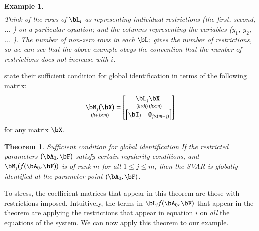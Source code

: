 \documentclass [12pt]{article}
\newtheorem{example}{Example}
\newtheorem{theorem}{Theorem}
\begin{document}
\begin{example}{}
\begin{align*}
        \end{align*}
        Think of the rows of $\bL_i$ as representing individual restrictions (the first, second, ...  ) on a particular equation; and the columns representing the variables ($y_1$, $y_2$, ... ). The number of non-zero \textit{rows} in each $\bL_i$ gives the number of restrictions, so we can see that the above example obeys the convention that the number of restrictions does not increase with $i$.
    \end{example}
    
    \citet{rub-wag-zha-restud10} state their sufficient condition for global identification in terms of the following matrix:
    \begin{equation}\label{eq:rwzT1}
        \underset{(h+j \times m)}{\bM_j( \bX )} = 
            \begin{bmatrix}
              \underset{(h \times h)}{\bL_j} \underset{(h \times m)}{\bX\phantom{_j}} \\
              \begin{bmatrix}
                \bI_j & \mathbf{0}_{j \times (m-j)}
              \end{bmatrix}
            \end{bmatrix}
    \end{equation}
    for any matrix $\bX$.
    
    \begin{theorem}{Sufficient condition for global identification} \label{thm:rwz}
      If the restricted parameters $(\bA_0, \bF)$ satisfy certain regularity conditions, and $\bM_j( f( \bA_0, \bF ) )$ is of rank $m$ for all $1 \le j \le m$, then the SVAR is globally identified at the parameter point $(\bA_0, \bF)$.
    \end{theorem}

    To stress, the coefficient matrices that appear in this theorem are those with restrictions imposed. Intuitively, the terms in $\bL_i f( \bA_0, \bF )$ that appear in the theorem are applying the restrictions that appear in equation $i$ on \textit{all} the equations of the system. We can now apply this theorem to our example.
    
\end{document}
